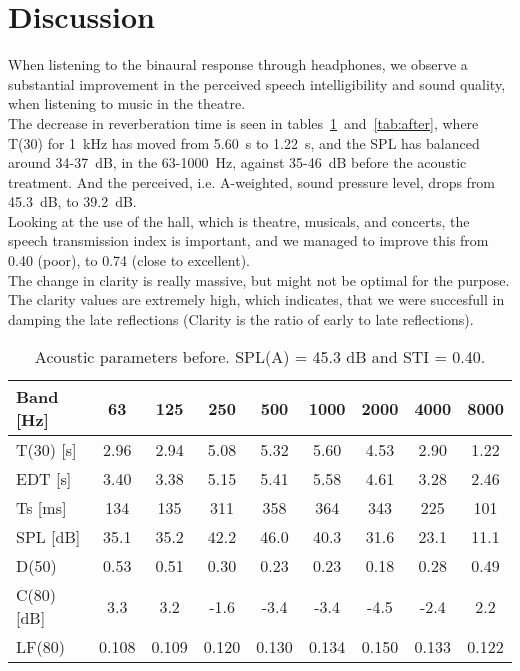 \section{Discussion} %
\label{sec:discussion}
When listening to the binaural response through headphones, we observe a substantial improvement in the perceived speech intelligibility and sound quality, when listening to music in the theatre.\\
The decrease in reverberation time is seen in tables~\ref{tab:before}~and~\ref{tab:after}, where T(30) for 1~kHz has moved from 5.60~s to 1.22~s, and the SPL has balanced around 34-37~dB, in the 63-1000~Hz, against 35-46~dB before the acoustic treatment. And the perceived, i.e. A-weighted, sound pressure level, drops from 45.3~dB, to 39.2~dB.\\
Looking at the use of the hall, which is theatre, musicals, and concerts, the speech transmission index is important, and we managed to improve this from 0.40 (poor), to 0.74 (close to excellent).\\
The change in clarity is really massive, but might not be optimal for the purpose. The clarity values are extremely high, which indicates, that we were succesfull in damping the late reflections (Clarity is the ratio of early to late reflections). 


\begin{table}[htdp]
\begin{center}\begin{tabular}{lcccccccc}
Band [Hz]   &       63    &   125   &    250    &   500  &    1000   &   2000   &   4000  & 8000 \\
\hline
T(30)  [s]   &   2.96   &   2.94  &    5.08   &   5.32   &   5.60  &    4.53  &    2.90  &    1.22 \\
EDT    [s]   &   3.40 &     3.38  &    5.15  &    5.41   &   5.58   &   4.61    &  3.28   &   2.46  \\
Ts     [ms] &  134  &     135   &    311    &   358   &    364  &     343 &      225  &     101    \\
SPL    [dB] &   35.1   &   35.2   &   42.2  &    46.0   &   40.3   &   31.6  &    23.1  &    11.1   \\
D(50)       &  0.53   &   0.51   &   0.30   &   0.23  &    0.23   &   0.18   &   0.28   &   0.49  \\
C(80)  [dB]  &   3.3     &  3.2   &   -1.6  &    -3.4  &    -3.4  &    -4.5  &    -2.4  &     2.2   \\
LF(80)    &      0.108   &  0.109    & 0.120   &  0.130  &   0.134 &    0.150 &    0.133   &  0.122
\end{tabular} 
\caption{Acoustic parameters before. SPL(A) = 45.3 dB and STI = 0.40.}
\end{center}
\label{tab:before}
\end{table}



